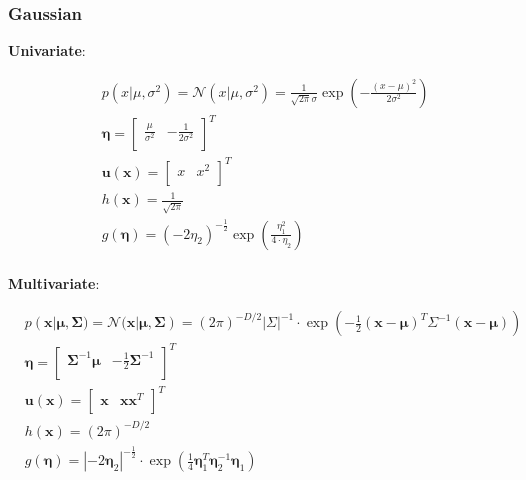 \subsubsection{Gaussian}
\textbf{Univariate}:
\begin{fleqn}[\parindent]
	\begin{equation*}
	\begin{split}
	& p(x|\mu, \sigma^2) = \mathcal{N}(x|\mu, \sigma^2) = \frac{1}{\sqrt{2\pi}\sigma}\exp\left(-\frac{(x-\mu)^2}{2\sigma^2}\right)\\[8pt]
	& \bm{\eta} = \begin{bmatrix}
	\frac{\mu}{\sigma^2} & -\frac{1}{2\sigma^2}\\
	\end{bmatrix}^T\\
	& \bm{u}(\bm{x}) = \begin{bmatrix}
	x & x^2\\
	\end{bmatrix}^T\\
	& h(\bm{x}) = \frac{1}{\sqrt{2\pi}}\\
	& g(\bm{\eta}) = (-2\eta_2)^{-\frac{1}{2}}\exp\left(\frac{\eta_1^2}{4\cdot \eta_2}\right)\\
	\end{split}
	\end{equation*}
\end{fleqn}
\textbf{Multivariate}:
\begin{fleqn}[\parindent]
	\begin{equation*}
		\begin{split}
			& p(\bm{x}|\bm{\mu}, \bm{\Sigma}) = \mathcal{N}(\bm{x}|\bm{\mu}, \bm{\Sigma}) = (2\pi)^{-D/2}|\Sigma|^{-1}\cdot \exp\left(-\frac{1}{2}(\bm{x}-\bm{\mu})^T\Sigma^{-1}(\bm{x}-\bm{\mu})\right)\\[8pt]
			& \bm{\eta} = \begin{bmatrix}
			\bm{\Sigma}^{-1}\bm{\mu} & -\frac{1}{2}\bm{\Sigma}^{-1}\\
			\end{bmatrix}^T\\
			& \bm{u}(\bm{x}) = \begin{bmatrix}
				\bm{x} & \bm{x}\bm{x}^T\\
			\end{bmatrix}^T\\
			& h(\bm{x}) = (2\pi)^{-D/2}\\
			& g(\bm{\eta}) = |-2\bm{\eta}_2|^{-\frac{1}{2}} \cdot \exp\left(\frac{1}{4}\bm{\eta}_{1}^T\bm{\eta}_{2}^{-1}\bm{\eta}_{1}\right)\\
		\end{split}
	\end{equation*}
\end{fleqn}
